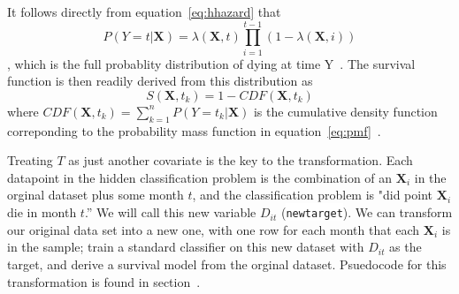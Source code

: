 \documentclass[10pt,letterpaper]{article}
\newcommand{\codewhite}[1]{\colorbox{white}{\texttt{#1}}}
\begin{document}
It follows directly from equation~\ref{eq:hhazard} that 
\begin{equation}
\label{eq:pmf}
P(Y = t | \mathbf{X}) = \lambda(\mathbf{X}, t) \prod_{i=1}^{t-1} (1 - \lambda(\mathbf{X}, i))
\end{equation},
which is the full probablity distribution of dying at time Y~\cite{kuhn}.
The survival function is then readily derived from this distribution as
\begin{equation}
\label{eq:cdf}
S(\mathbf{X},t_{k}) = 1 - CDF(\mathbf{X}, t_{k})
\end{equation}
where $CDF(\mathbf{X}, t_{k}) = \sum_
{k=1}^{n} P(Y = t_{k} | \mathbf{X}) $ is the cumulative density function correponding to the probability mass function in equation~\ref{eq:pmf}~\cite{downey}.











Treating $T$ as just another covariate is the key to the transformation. Each datapoint in the hidden classification problem is the combination of an $\mathbf{X}_{i}$ in the orginal dataset plus some month $t$, and the classification problem is "did point $\mathbf{X}_{i}$ die in month $t$.'' We will call this new variable $D_{it}$ (\codewhite{newtarget}).
We can transform our original data set into a new one, with one row for each month that each $\mathbf{X}_{i}$ is in the sample; train a standard classifier on this new dataset with $D_{it}$ as the target, and derive a survival model from the orginal dataset.
Psuedocode for this transformation is found in section~.
\end{document}

